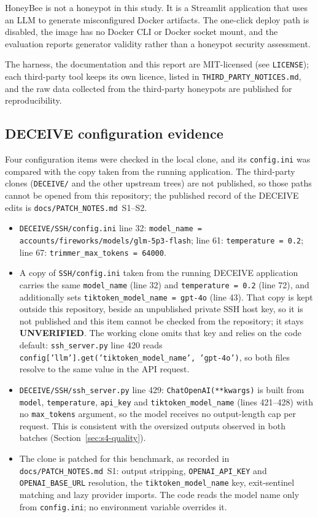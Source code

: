 \documentclass[a4paper,11pt]{article}
\begin{document}
HoneyBee is not a honeypot in this study. It is a Streamlit application that
uses an LLM to generate misconfigured Docker artifacts. The one-click deploy
path is disabled, the image has no Docker CLI or Docker socket mount, and the
evaluation reports generator validity rather than a honeypot security
assessment.

The harness, the documentation and this report are MIT-licensed (see
\texttt{LICENSE}); each third-party tool keeps its own licence, listed in
\texttt{THIRD\_PARTY\_NOTICES.md}, and the raw data collected from the
third-party honeypots are published for reproducibility.

\subsection{DECEIVE configuration evidence}

Four configuration items were checked in the local clone, and its
\texttt{config.ini} was compared with the copy taken from the running
application. The third-party clones (\texttt{DECEIVE/} and the other upstream
trees) are not published, so those paths cannot be opened from this repository;
the published record of the DECEIVE edits is
\texttt{docs/PATCH\_NOTES.md}~S1--S2.
\begin{itemize}[leftmargin=*]
\item \texttt{DECEIVE/SSH/config.ini} line 32: \texttt{model\_name =
  accounts/fireworks/models/glm-5p3-flash}; line 61: \texttt{temperature =
  0.2}; line 67: \texttt{trimmer\_max\_tokens = 64000}.
\item A copy of \texttt{SSH/config.ini} taken from the running DECEIVE
  application carries the same \texttt{model\_name} (line 32) and
  \texttt{temperature = 0.2} (line 72), and additionally sets
  \texttt{tiktoken\_model\_name = gpt-4o} (line 43). That copy is kept outside
  this repository, beside an unpublished private SSH host key, so it is not
  published and this item cannot be checked from the repository; it stays
  \textbf{UNVERIFIED}. The working clone omits that key and relies on the code
  default: \texttt{ssh\_server.py} line 420 reads
  \texttt{config['llm'].get('tiktoken\_model\_name', 'gpt-4o')}, so both files
  resolve to the same value in the API request.
\item \texttt{DECEIVE/SSH/ssh\_server.py} line 429: \texttt{ChatOpenAI(**kwargs)}
  is built from \texttt{model}, \texttt{temperature}, \texttt{api\_key} and
  \texttt{tiktoken\_model\_name} (lines 421--428) with no \texttt{max\_tokens}
  argument, so the model receives no output-length cap per request. This is
  consistent with the oversized outputs observed in both batches
  (Section~\ref{sec:s4-quality}).
\item The clone is patched for this benchmark, as recorded in
  \texttt{docs/PATCH\_NOTES.md}~S1: output stripping, \texttt{OPENAI\_API\_KEY}
  and \texttt{OPENAI\_BASE\_URL} resolution, the \texttt{tiktoken\_model\_name}
  key, exit-sentinel matching and lazy provider imports. The code reads the
  model name only from \texttt{config.ini}; no environment variable overrides
  it.
\end{itemize}
\end{document}
